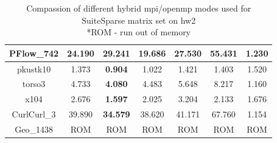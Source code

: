 \begin{table}[h!]
\begin{tabular}{|c|c|c|c|c|c|c|}
\\ \hline
PFlow\_742                                            & 24.190                                                    & 29.241                                                     & \textbf{19.686}                                           & 27.530                                                     & 55.431                                                     & 1.230                                                           \\ \hline
pkustk10                                              & 1.373                                                     & \textbf{0.904}                                             & 1.022                                                     & 1.421                                                      & 1.403                                                      & 1.520                                                           \\ \hline
torso3                                                & 4.733                                                     & \textbf{4.080}                                             & 4.483                                                     & 5.648                                                      & 8.217                                                      & 1.160                                                           \\ \hline
x104                                                  & 2.676                                                     & \textbf{1.597}                                             & 2.025                                                     & 3.204                                                      & 2.133                                                      & 1.676                                                           \\ \hline
CurlCurl\_3                                           & 39.890                                                    & \textbf{34.579}                                            & 38.620                                                    & 41.171                                                     & 67.760                                                     & 1.154                                                           \\ \hline
Geo\_1438                                             & ROM                                                       & ROM                                                        & ROM                                                       & ROM                                                        & ROM                                                        & ROM                                                             \\ \hline
\end{tabular}
\caption{Compassion of different hybrid \gls{mpi}/\gls{openmp} modes used for SuiteSparse matrix set on \gls{hw2}\\
*ROM - run out of memory}
\label{fig:mpi-omp-suitesparse-hw2}
\end{table}


